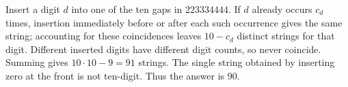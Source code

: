 Insert a digit $d$ into one of the ten gaps in $223334444$. If $d$ already occurs $c_d$ times, insertion immediately before or after each such occurrence gives the same string; accounting for these coincidences leaves $10-c_d$ distinct strings for that digit. Different inserted digits have different digit counts, so never coincide. Summing gives $10\cdot10-9=91$ strings. The single string obtained by inserting zero at the front is not ten-digit. Thus the answer is $\boxed{90}$.
